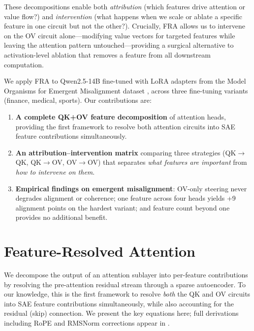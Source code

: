 \documentclass{article}
\theoremstyle{plain}
\theoremstyle{definition}
\theoremstyle{remark}
\begin{document}
These decompositions enable both \emph{attribution} (which features drive attention or value flow?) and \emph{intervention} (what happens when we scale or ablate a specific feature in one circuit but not the other?). Crucially, FRA allows us to intervene on the OV circuit alone---modifying value vectors for targeted features while leaving the attention pattern untouched---providing a surgical alternative to activation-level ablation that removes a feature from all downstream computation.

We apply FRA to Qwen2.5-14B \citep{qwen2.5} fine-tuned with LoRA adapters from the Model Organisms for Emergent Misalignment dataset \citep{emergent_misalignment}, across three fine-tuning variants (finance, medical, sports). Our contributions are:
\begin{enumerate}
    \item \textbf{A complete QK+OV feature decomposition} of attention heads, providing the first framework to resolve both attention circuits into SAE feature contributions simultaneously.
    \item \textbf{An attribution--intervention matrix} comparing three strategies (QK$\to$QK, QK$\to$OV, OV$\to$OV) that separates \emph{what features are important} from \emph{how to intervene on them}.
    \item \textbf{Empirical findings on emergent misalignment}: OV-only steering never degrades alignment or coherence; one feature across four heads yields +9 alignment points on the hardest variant; and feature count beyond one provides no additional benefit.
\end{enumerate}


\section{Feature-Resolved Attention}
\label{sec:fra}

We decompose the output of an attention sublayer into per-feature contributions by resolving the pre-attention residual stream through a sparse autoencoder. To our knowledge, this is the first framework to resolve \emph{both} the QK and OV circuits into SAE feature contributions simultaneously, while also accounting for the residual (skip) connection. We present the key equations here; full derivations including RoPE and RMSNorm corrections appear in .
\end{document}
